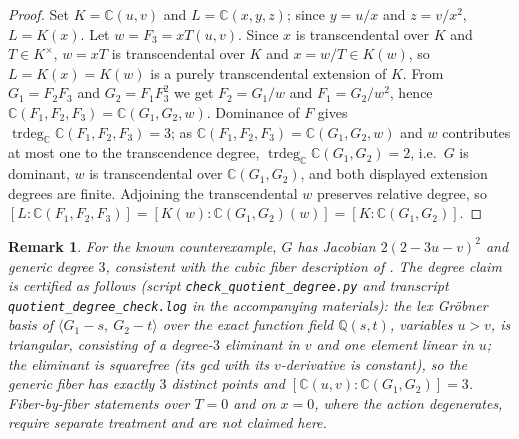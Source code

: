 \documentclass[11pt]{article}
\newtheorem{remark}{Remark}
\newcommand{\C}{\mathbb{C}}
\begin{document}
\begin{proof}
Set $K=\C(u,v)$ and $L=\C(x,y,z)$; since $y=u/x$ and $z=v/x^2$, $L=K(x)$. Let
$w=F_3=xT(u,v)$. Since $x$ is transcendental over $K$ and $T\in K^{\times}$,
$w=xT$ is transcendental over $K$ and $x=w/T\in K(w)$, so $L=K(x)=K(w)$ is a
purely transcendental extension of $K$. From $G_1=F_2F_3$
and $G_2=F_1F_3^{2}$ we get $F_2=G_1/w$ and $F_1=G_2/w^{2}$, hence
$\C(F_1,F_2,F_3)=\C(G_1,G_2,w)$. Dominance of $F$ gives
$\operatorname{trdeg}_{\C}\C(F_1,F_2,F_3)=3$; as
$\C(F_1,F_2,F_3)=\C(G_1,G_2,w)$ and $w$ contributes at most one to the
transcendence degree, $\operatorname{trdeg}_{\C}\C(G_1,G_2)=2$, i.e.\ $G$ is
dominant, $w$ is transcendental over $\C(G_1,G_2)$, and both displayed
extension degrees are finite. Adjoining the transcendental $w$ preserves
relative degree, so
$[L:\C(F_1,F_2,F_3)]=[K(w):\C(G_1,G_2)(w)]=[K:\C(G_1,G_2)]$.
\end{proof}

\begin{remark}
For the known counterexample, $G$ has Jacobian $2(2-3u-v)^{2}$ and generic
degree $3$, consistent with the cubic fiber description of
\cite{ulam2026}. The degree claim is certified as follows (script
\texttt{check\_quotient\_degree.py} and transcript
\texttt{quotient\_degree\_check.log} in the accompanying materials): the lex
Gr\"obner basis of $\langle G_1-s,\ G_2-t\rangle$ over the exact function
field $\mathbb{Q}(s,t)$, variables $u>v$, is triangular, consisting of a
degree-$3$ eliminant in $v$ and one element linear in $u$; the eliminant is
squarefree (its gcd with its $v$-derivative is constant), so the generic
fiber has exactly $3$ distinct points and
$[\C(u,v):\C(G_1,G_2)]=3$. Fiber-by-fiber
statements over $T=0$ and on $x=0$, where the action degenerates, require separate
treatment and are not claimed here.
\end{remark}
\end{document}
